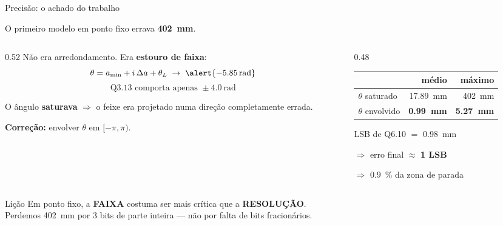 \documentclass[aspectratio=169, 11pt]{beamer}
\begin{document}
\begin{frame}{Precisão: o achado do trabalho}
\begin{center}
\alert{\Large O primeiro modelo em ponto fixo errava \textbf{\SI{402}{\milli\metre}}.}
\end{center}

\vspace{3mm}
\begin{columns}[T]
\begin{column}{0.52\textwidth}
\footnotesize
Não era arredondamento. Era \textbf{estouro de faixa}:
\[ \theta = a_{\min} + i\,\Delta a + \theta_L \;\to\; \alert{\SI{-5.85}{\radian}} \]
\vspace{-3mm}
\[ \text{Q3.13 comporta apenas } \pm\SI{4.0}{\radian} \]

\vspace{2mm}
O ângulo \textbf{saturava} $\Rightarrow$ o feixe era projetado numa direção
completamente errada.

\vspace{2mm}
\textbf{Correção:} envolver $\theta$ em $[-\pi,\pi)$.
\end{column}
\begin{column}{0.48\textwidth}
\centering
\begin{tabular}{@{}lrr@{}}
\toprule
& \scriptsize médio & \scriptsize máximo \\
\midrule
\scriptsize $\theta$ saturado & \scriptsize \SI{17.89}{\milli\metre} & \alert{\scriptsize \SI{402}{\milli\metre}} \\
\scriptsize $\theta$ envolvido & \scriptsize \textbf{\SI{0.99}{\milli\metre}} & \scriptsize \textbf{\SI{5.27}{\milli\metre}} \\
\bottomrule
\end{tabular}

\vspace{4mm}
\footnotesize
LSB de Q6.10 $=$ \SI{0.98}{\milli\metre}

$\Rightarrow$ erro final $\approx$ \textbf{1 LSB}

$\Rightarrow$ \SI{0.9}{\percent} da zona de parada
\end{column}
\end{columns}

\vspace{4mm}
\begin{alertblock}{Lição}
\centering
Em ponto fixo, a \textbf{FAIXA} costuma ser mais crítica que a \textbf{RESOLUÇÃO}.\\
\footnotesize Perdemos \SI{402}{\milli\metre} por 3 bits de parte inteira --- não por falta de bits fracionários.
\end{alertblock}
\end{frame}
\end{document}
